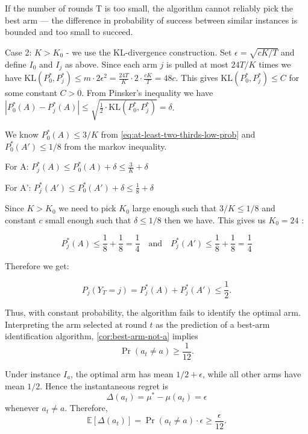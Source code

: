 \documentclass[12pt]{article}
\begin{document}
\noindent If the number of rounds T is too small, the algorithm cannot reliably pick the best arm — the difference in probability of success between similar instances is bounded and too small to succeed.

\vspace{5mm}

\noindent Case 2: $K > K_0$  - we use the KL-divergence construction. Set $\epsilon = \sqrt{cK / T}$ and define $I_0$ and $I_j$ as above. Since each arm $j$ is pulled at most $24T/K$ times we have $\mathrm{KL}(P_0^*, P_j^*) \leq m \cdot 2\epsilon^2 = \frac{24T}{K} \cdot 2 \cdot \frac{cK}{T} = 48c$. This gives $\mathrm{KL}(P_0^*, P_j^*) \leq C$ for some constant $C > 0$. From Pinsker's inequality we have $|P_0^*(A) - P_j^*(A)| \leq \sqrt{\frac{1}{2} \cdot \mathrm{KL}(P_0^*, P_j^*)} = \delta$. 

\vspace{5mm}

\noindent We know $P^*_0(A) \leq 3/K$ from \ref{eq:at-least-two-thirds-low-prob} and $P^*_0(A') \leq 1/8$ from the markov inequality. 

\vspace{5mm}

\noindent For A: $P^*_j(A) \leq P^*_0(A) + \delta \leq \frac{3}{K} + \delta$ 

\noindent For A': $P^*_j(A') \leq P^*_0(A') + \delta \leq \frac{1}{8} + \delta$ 

\vspace{5mm}

\noindent  Since $K > K_0$ we need to pick $K_0$ large enough such that $3/K \leq 1/8$ and constant $c$ small enough such that $\delta \leq 1/8$ then we have. This gives us $K_0 = 24$ :

\[
P^*_j(A) \leq \frac{1}{8} + \frac{1}{8} = \frac{1}{4} \quad \text{and} \quad P^*_j(A') \leq \frac{1}{8} + \frac{1}{8} = \frac{1}{4}
\]

\noindent  Therefore we get:

\[
P_j(Y_T=j) = P^*_j(A)+P^*_j(A') \le \frac12.
\]

\noindent Thus, with constant probability, the algorithm fails to identify the optimal arm. Interpreting the arm selected at round $t$ as the prediction of a best-arm identification algorithm, \ref{cor:best-arm-not-a} implies
\[
\Pr(a_t \ne a) \ge \frac{1}{12}.
\]

\noindent Under instance $I_a$, the optimal arm has mean $1/2+\epsilon$, while all other arms have mean $1/2$. Hence the instantaneous regret is
\[
\Delta(a_t)=\mu^*-\mu(a_t)=\epsilon
\]
\noindent whenever $a_t \ne a$. Therefore,
\[
\mathbb{E}[\Delta(a_t)]
=
\Pr(a_t \ne a)\cdot \epsilon
\ge
\frac{\epsilon}{12}.
\]
\end{document}
